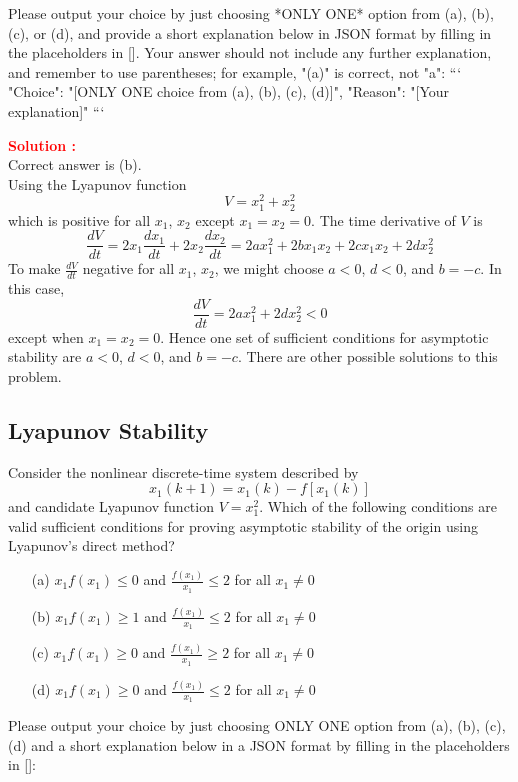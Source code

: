 \documentclass[12pt]{article}
\begin{document}
Please output your choice by just choosing *ONLY ONE* option from (a), (b), (c), or (d), and provide a short explanation below in JSON format by filling in the placeholders in []. Your answer should not include any further explanation, and remember to use parentheses; for example, "(a)" is correct, not "a":
```
{
"Choice": "[ONLY ONE choice from (a), (b), (c), (d)]",
"Reason": "[Your explanation]"
}
```

\textbf{\textcolor{red}{Solution :}} \\
Correct answer is (b).\\
Using the Lyapunov function
\[ V = x_1^2 + x_2^2 \]
which is positive for all \(x_1\), \(x_2\) except \(x_1 = x_2 = 0\). The time derivative of \(V\) is
\[
\frac{dV}{dt} = 2x_1 \frac{dx_1}{dt} + 2x_2 \frac{dx_2}{dt} = 2ax_1^2 + 2bx_1x_2 + 2cx_1x_2 + 2dx_2^2
\]
To make \(\frac{dV}{dt}\) negative for all \(x_1\), \(x_2\), we might choose \(a < 0\), \(d < 0\), and \(b = -c\). In this case,
\[
\frac{dV}{dt} = 2ax_1^2 + 2dx_2^2 < 0
\]
except when \(x_1 = x_2 = 0\). Hence one set of sufficient conditions for asymptotic stability are \(a < 0\), \(d < 0\), and \(b = -c\). There are other possible solutions to this problem.
\clearpage

\subsection{Lyapunov Stability}

Consider the nonlinear discrete-time system described by
\[ x_1(k+1) = x_1(k) - f[x_1(k)] \]
and candidate Lyapunov function $V = x_1^2$. Which of the following conditions are valid sufficient conditions for proving asymptotic stability of the origin using Lyapunov's direct method?

\begin{itemize}
    \item[(a)] \(x_1 f(x_1) \leq 0\) and \(\frac{f(x_1)}{x_1} \leq 2\) for all $x_1\neq 0$
    \item[(b)] \(x_1 f(x_1) \geq 1\) and \(\frac{f(x_1)}{x_1} \leq 2\) for all $x_1\neq 0$
    \item[(c)] \(x_1 f(x_1) \geq 0\) and \(\frac{f(x_1)}{x_1} \geq 2\) for all $x_1\neq 0$
    \item[(d)]\(x_1 f(x_1) \geq 0\) and \(\frac{f(x_1)}{x_1} \leq 2\) for all $x_1 \neq 0$
\end{itemize}

Please output your choice by just choosing ONLY ONE option from (a), (b), (c), (d) and a short explanation below in a JSON format by filling in the placeholders in []:
\end{document}
